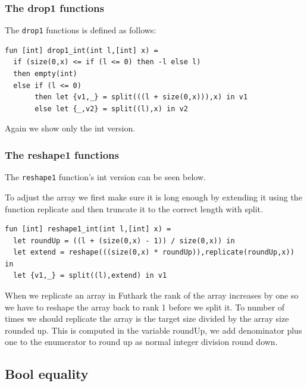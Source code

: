 \documentclass[11pt]{article}
\begin{document}
\subsubsection{The drop1 functions}
The {\tt drop1} functions is defined as follows: 
\begin{lstlisting}[language=Futhark]
fun [int] drop1_int(int l,[int] x) =
  if (size(0,x) <= if (l <= 0) then -l else l)
  then empty(int)
  else if (l <= 0)
       then let {v1,_} = split(((l + size(0,x))),x) in v1
       else let {_,v2} = split((l),x) in v2
\end{lstlisting}
Again we show only the int version. 

\subsubsection{The reshape1 functions}
The {\tt reshape1} function's int version can be seen below.

To adjust the array we first make sure it is long enough by extending it using the function replicate and then
truncate it to the correct length with split.

\begin{lstlisting}[language=Futhark]
fun [int] reshape1_int(int l,[int] x) =
  let roundUp = ((l + (size(0,x) - 1)) / size(0,x)) in
  let extend = reshape(((size(0,x) * roundUp)),replicate(roundUp,x)) in
  let {v1,_} = split((l),extend) in v1
\end{lstlisting}

When we replicate an array in Futhark the rank of the array increases by one so we have to reshape the array back to rank 1 before
we split it. To number of times we should replicate the array is the target size divided by the array size rounded up.
This is computed in the variable roundUp, we add denominator plus one to the enumerator to round up as normal integer division
round down.


\subsection{Bool equality}
\end{document}
